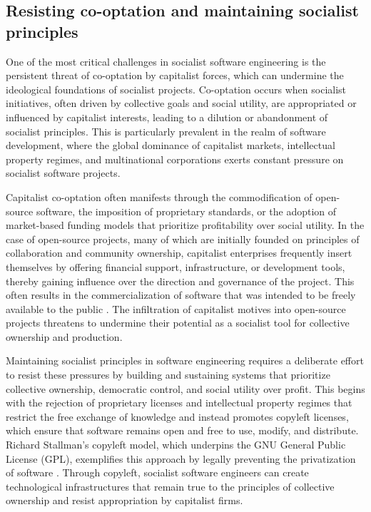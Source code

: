 \begin{refsection}
\subsection{Resisting co-optation and maintaining socialist principles}

One of the most critical challenges in socialist software engineering is the persistent threat of co-optation by capitalist forces, which can undermine the ideological foundations of socialist projects. Co-optation occurs when socialist initiatives, often driven by collective goals and social utility, are appropriated or influenced by capitalist interests, leading to a dilution or abandonment of socialist principles. This is particularly prevalent in the realm of software development, where the global dominance of capitalist markets, intellectual property regimes, and multinational corporations exerts constant pressure on socialist software projects.

Capitalist co-optation often manifests through the commodification of open-source software, the imposition of proprietary standards, or the adoption of market-based funding models that prioritize profitability over social utility. In the case of open-source projects, many of which are initially founded on principles of collaboration and community ownership, capitalist enterprises frequently insert themselves by offering financial support, infrastructure, or development tools, thereby gaining influence over the direction and governance of the project. This often results in the commercialization of software that was intended to be freely available to the public \cite[pp.~78-82]{stallman2002}. The infiltration of capitalist motives into open-source projects threatens to undermine their potential as a socialist tool for collective ownership and production.

Maintaining socialist principles in software engineering requires a deliberate effort to resist these pressures by building and sustaining systems that prioritize collective ownership, democratic control, and social utility over profit. This begins with the rejection of proprietary licenses and intellectual property regimes that restrict the free exchange of knowledge and instead promotes copyleft licenses, which ensure that software remains open and free to use, modify, and distribute. Richard Stallman’s copyleft model, which underpins the GNU General Public License (GPL), exemplifies this approach by legally preventing the privatization of software \cite[pp.~12-15]{stallman2002}. Through copyleft, socialist software engineers can create technological infrastructures that remain true to the principles of collective ownership and resist appropriation by capitalist firms.


\end{refsection}
